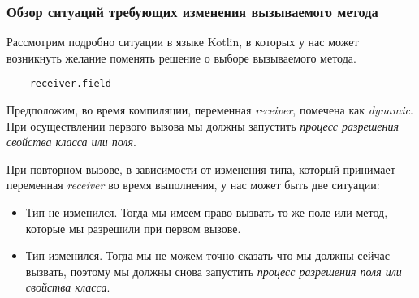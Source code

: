 \subsubsection{Обзор ситуаций требующих изменения вызываемого метода}
\label{sec:methodChangeOverview}

Рассмотрим подробно ситуации в языке Kotlin, в которых у нас может возникнуть желание поменять решение о выборе вызываемого метода.

\begin{verbatim}
    receiver.field
\end{verbatim}

Предположим, во время компиляции, переменная \textit{receiver}, помечена как \textit{dynamic}. При осуществлении первого
вызова мы должны запустить \textit{процесс разрешения свойства класса или поля}.


При повторном вызове, в зависимости от изменения типа, который принимает переменная \textit{receiver} во время выполнения, у нас может быть две ситуации:

\begin{itemize}
    \item Тип не изменился. Тогда мы имеем право вызвать то же поле или метод, которые мы разрешили при первом вызове.
    \item Тип изменился. Тогда мы не можем точно сказать что мы должны сейчас вызвать, поэтому мы должны снова запустить \textit{процесс разрешения поля или свойства класса}.
\end{itemize}

